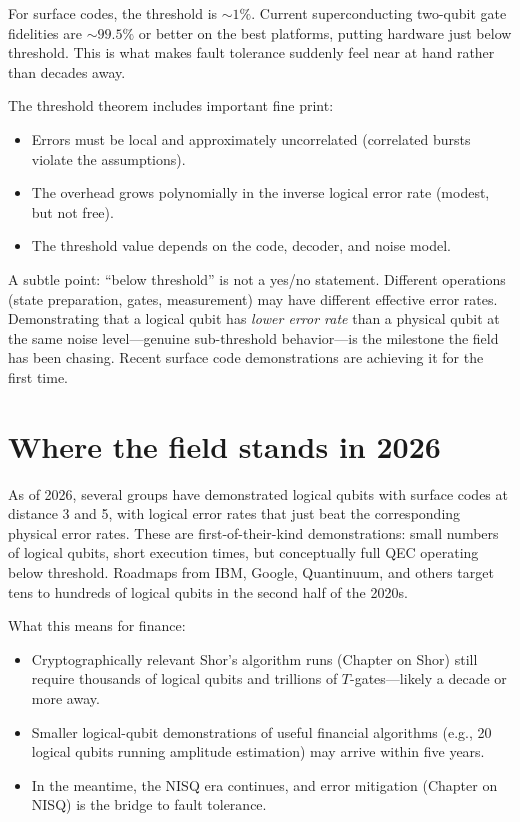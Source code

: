 For surface codes, the threshold is $\sim 1\%$. Current superconducting two-qubit gate fidelities are $\sim 99.5\%$ or better on the best platforms, putting hardware just below threshold. This is what makes fault tolerance suddenly feel near at hand rather than decades away.

The threshold theorem includes important fine print:
\begin{itemize}
\item Errors must be local and approximately uncorrelated (correlated bursts violate the assumptions).
\item The overhead grows polynomially in the inverse logical error rate (modest, but not free).
\item The threshold value depends on the code, decoder, and noise model.
\end{itemize}

\begin{remark}
A subtle point: ``below threshold'' is not a yes/no statement. Different operations (state preparation, gates, measurement) may have different effective error rates. Demonstrating that a logical qubit has \emph{lower error rate} than a physical qubit at the same noise level---genuine sub-threshold behavior---is the milestone the field has been chasing. Recent surface code demonstrations are achieving it for the first time.
\end{remark}

\section{Where the field stands in 2026}

As of 2026, several groups have demonstrated logical qubits with surface codes at distance 3 and 5, with logical error rates that just beat the corresponding physical error rates. These are first-of-their-kind demonstrations: small numbers of logical qubits, short execution times, but conceptually full QEC operating below threshold. Roadmaps from IBM, Google, Quantinuum, and others target tens to hundreds of logical qubits in the second half of the 2020s.

What this means for finance:
\begin{itemize}
\item Cryptographically relevant Shor's algorithm runs (Chapter on Shor) still require thousands of logical qubits and trillions of $T$-gates---likely a decade or more away.
\item Smaller logical-qubit demonstrations of useful financial algorithms (e.g., 20 logical qubits running amplitude estimation) may arrive within five years.
\item In the meantime, the NISQ era continues, and error mitigation (Chapter on NISQ) is the bridge to fault tolerance.
\end{itemize}

